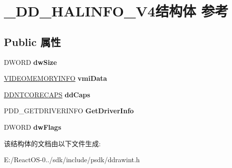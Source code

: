 \hypertarget{struct___d_d___h_a_l_i_n_f_o___v4}{}\section{\+\_\+\+D\+D\+\_\+\+H\+A\+L\+I\+N\+F\+O\+\_\+\+V4结构体 参考}
\label{struct___d_d___h_a_l_i_n_f_o___v4}
\subsection*{Public 属性}
\begin{DoxyCompactItemize}
\item 
\mbox{\label{struct___d_d___h_a_l_i_n_f_o___v4_a350863bfc92925b7fba19d395d421ba9}} 
D\+W\+O\+RD {\bfseries dw\+Size}
\item 
\mbox{\label{struct___d_d___h_a_l_i_n_f_o___v4_a4a5f5d37b6bdb303ba9f9268c1e24a75}} 
\hyperlink{struct___v_i_d_e_o_m_e_m_o_r_y_i_n_f_o}{V\+I\+D\+E\+O\+M\+E\+M\+O\+R\+Y\+I\+N\+FO} {\bfseries vmi\+Data}
\item 
\mbox{\label{struct___d_d___h_a_l_i_n_f_o___v4_ac52559ddd60c76ecdc5f5f42a1dbaa65}} 
\hyperlink{struct___d_d_n_t_c_o_r_e_c_a_p_s}{D\+D\+N\+T\+C\+O\+R\+E\+C\+A\+PS} {\bfseries dd\+Caps}
\item 
\mbox{\label{struct___d_d___h_a_l_i_n_f_o___v4_a97b14730d9a6355caaf7153864df9b52}} 
P\+D\+D\+\_\+\+G\+E\+T\+D\+R\+I\+V\+E\+R\+I\+N\+FO {\bfseries Get\+Driver\+Info}
\item 
\mbox{\label{struct___d_d___h_a_l_i_n_f_o___v4_a9a463aabc3363aa60467e7b7e9d56e95}} 
D\+W\+O\+RD {\bfseries dw\+Flags}
\end{DoxyCompactItemize}


该结构体的文档由以下文件生成\+:\begin{DoxyCompactItemize}
\item 
E\+:/\+React\+O\+S-\/0../sdk/include/psdk/ddrawint.\+h\end{DoxyCompactItemize}
